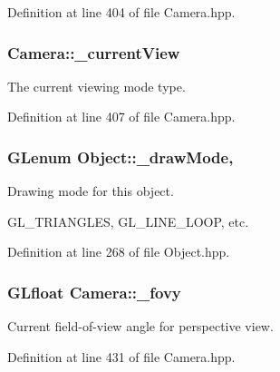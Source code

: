 Definition at line 404 of file Camera.\-hpp.

\hypertarget{class_camera_ac9062d9bb891aa81d163076738451081}{
\subsubsection[{\-\_\-current\-View}]{ Camera\-::\-\_\-current\-View\hspace{0.3cm}{\ttfamily [private]}}}\label{class_camera_ac9062d9bb891aa81d163076738451081}


The current viewing mode type. 



Definition at line 407 of file Camera.\-hpp.

\hypertarget{class_object_ae8457eabfb89d55826142508013b56c0}{
\subsubsection[{\-\_\-draw\-Mode}]{\setlength{\rightskip}{0pt plus 5cm}G\-Lenum Object\-::\-\_\-draw\-Mode\hspace{0.3cm}{\ttfamily [protected]}, {\ttfamily [inherited]}}}\label{class_object_ae8457eabfb89d55826142508013b56c0}


Drawing mode for this object. 

G\-L\-\_\-\-T\-R\-I\-A\-N\-G\-L\-E\-S, G\-L\-\_\-\-L\-I\-N\-E\-\_\-\-L\-O\-O\-P, etc. 

Definition at line 268 of file Object.\-hpp.

\hypertarget{class_camera_a82542bb76347e2a2bb66b3bb7842945b}{
\subsubsection[{\-\_\-fovy}]{\setlength{\rightskip}{0pt plus 5cm}G\-Lfloat Camera\-::\-\_\-fovy\hspace{0.3cm}{\ttfamily [private]}}}\label{class_camera_a82542bb76347e2a2bb66b3bb7842945b}


Current field-\/of-\/view angle for perspective view. 



Definition at line 431 of file Camera.\-hpp.

